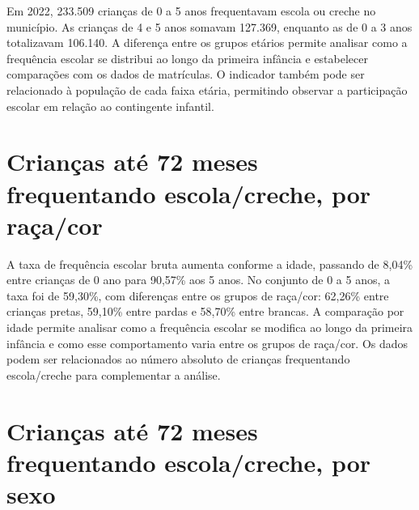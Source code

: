 
Em 2022, 233.509 crianças de 0 a 5 anos frequentavam escola ou creche no município. As crianças de 4 e 5 anos somavam 127.369, enquanto as de 0 a 3 anos totalizavam 106.140. A diferença entre os grupos etários permite analisar como a frequência escolar se distribui ao longo da primeira infância e estabelecer comparações com os dados de matrículas. O indicador também pode ser relacionado à população de cada faixa etária, permitindo observar a participação escolar em relação ao contingente infantil.


\section{Crianças até 72 meses frequentando escola/\allowbreak{}creche, por raça/\allowbreak{}cor}


A taxa de frequência escolar bruta aumenta conforme a idade, passando de 8,04\% entre crianças de 0 ano para 90,57\% aos 5 anos. No conjunto de 0 a 5 anos, a taxa foi de 59,30\%, com diferenças entre os grupos de raça/cor: 62,26\% entre crianças pretas, 59,10\% entre pardas e 58,70\% entre brancas. A comparação por idade permite analisar como a frequência escolar se modifica ao longo da primeira infância e como esse comportamento varia entre os grupos de raça/cor. Os dados podem ser relacionados ao número absoluto de crianças frequentando escola/creche para complementar a análise.


\section{Crianças até 72 meses frequentando escola/\allowbreak{}creche, por sexo}

